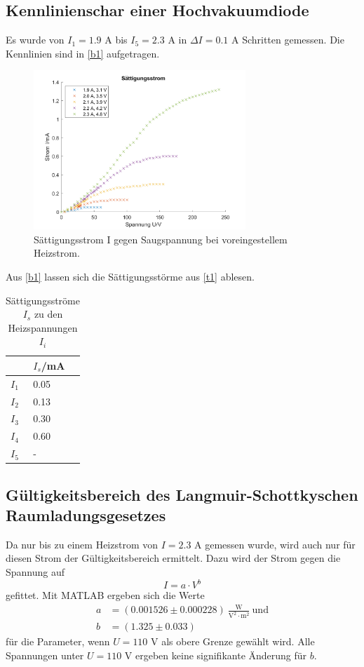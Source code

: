  \subsection{Kennlinienschar einer Hochvakuumdiode}
 Es wurde von $I_{1}=1.9$ A bis $I_{5}=2.3$ A in $\Delta I=0.1$ A Schritten gemessen. Die Kennlinien sind in \autoref{b1} aufgetragen.
 \begin{figure}[H]
 \centering
 \includegraphics[width=8cm]{s.png}
 \caption{Sättigungsstrom I gegen Saugspannung bei voreingestellem Heizstrom.}
 \label{b1}
 \end{figure}
 Aus \autoref{b1} lassen sich die Sättigungsstörme aus \autoref{t1} ablesen. 
 \begin{table}[H]
  \centering
  \caption{Sättigungsströme $I_{s}$ zu den Heizspannungen $I_{i}$}
  \begin{tabular}{l|l}
  & $I_{s}$/mA\\\hline
  $I_{1}$ & 0.05\\
  $I_{2}$ & 0.13\\
  $I_{3}$ & 0.30\\
  $I_{4}$ & 0.60\\
  $I_{5}$ & -\\\hline
  \end{tabular}
  \label{t1}
 \end{table}

 \subsection{Gültigkeitsbereich des Langmuir-Schottkyschen Raumladungsgesetzes}
 Da nur bis zu einem Heizstrom von $I=2.3$ A gemessen wurde, wird auch nur für diesen Strom der Gültigkeitsbereich ermittelt. Dazu wird der Strom gegen die Spannung auf
 \begin{equation*}
   I=a\cdot V^{b}
 \end{equation*}
 gefittet. Mit MATLAB ergeben sich die Werte
 \begin{align*}
   a&=(0.001526 \pm 0.000228)\ \frac{\textrm{W}}{\textrm{V}^2 \cdot\textrm{m}^2}\ \textrm{und}\\
   b&=(1.325 \pm 0.033)
 \end{align*}
 für die Parameter, wenn $U=110$ V als obere Grenze gewählt wird. Alle Spannungen unter $U=110$ V ergeben keine signifikante Änderung für $b$.
 
